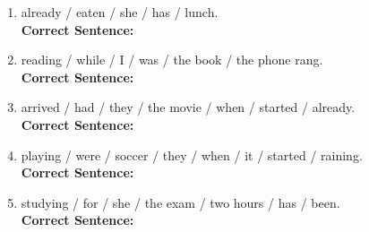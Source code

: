 \begin{enumerate}
    \item already / eaten / she / has / lunch.\\
    \textbf{Correct Sentence:} \underline{\hspace{10cm}}
    
    \item reading / while / I / was / the book / the phone rang.\\
    \textbf{Correct Sentence:} \underline{\hspace{10cm}}
    
    \item arrived / had / they / the movie / when / started / already.\\
    \textbf{Correct Sentence:} \underline{\hspace{10cm}}
    
    \item playing / were / soccer / they / when / it / started / raining.\\
    \textbf{Correct Sentence:} \underline{\hspace{10cm}}
    
    \item studying / for / she / the exam / two hours / has / been.\\
    \textbf{Correct Sentence:} \underline{\hspace{10cm}}
\end{enumerate}